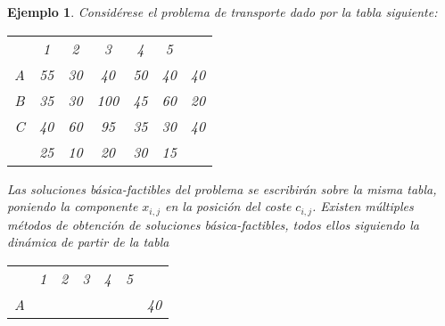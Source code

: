 \documentclass[11pt]{report}
\theoremstyle{mytheorem}
\theoremstyle{mydefinition}
\theoremstyle{myexample}
\newtheorem*{example}{Ejemplo}
\begin{document}
\begin{example}
Considérese el problema de transporte dado por la tabla siguiente:
\begin{center}
\setlength\extrarowheight{2pt}
\begin{tabular}{ccccccc}
    \multicolumn{1}{c}{} & \multicolumn{1}{c}{1} & \multicolumn{1}{c}{2} & \multicolumn{1}{c}{3} & \multicolumn{1}{c}{4} & \multicolumn{1}{c}{5} & \multicolumn{1}{c}{} \\ \cline{2-6}

    \multicolumn{1}{c|}{A} & \multicolumn{1}{c}{55} & \multicolumn{1}{c}{30} & \multicolumn{1}{c}{40} &  \multicolumn{1}{c}{50} & \multicolumn{1}{c|}{40} & \multicolumn{1}{c}{40} \\

    \multicolumn{1}{c|}{B} & \multicolumn{1}{c}{35} & \multicolumn{1}{c}{30} & \multicolumn{1}{c}{100} &  \multicolumn{1}{c}{45} & \multicolumn{1}{c|}{60} & \multicolumn{1}{c}{20} \\
    
    \multicolumn{1}{c|}{C} & \multicolumn{1}{c}{40} & \multicolumn{1}{c}{60} & \multicolumn{1}{c}{95} &  \multicolumn{1}{c}{35} & \multicolumn{1}{c|}{30} & \multicolumn{1}{c}{40} \\[2pt] \cline{2-6}

    \multicolumn{1}{c}{} & \multicolumn{1}{c}{25} & \multicolumn{1}{c}{10} & \multicolumn{1}{c}{20} & \multicolumn{1}{c}{30} & \multicolumn{1}{c}{15} & \multicolumn{1}{c}{} \\
\end{tabular}
\end{center}
Las soluciones básica-factibles del problema se escribirán sobre la misma tabla, poniendo la componente $x_{i,j}$ en la posición del coste $c_{i,j}$. Existen múltiples métodos de obtención de soluciones básica-factibles, todos ellos siguiendo la dinámica de partir de la tabla

\begin{center}
\setlength\extrarowheight{2pt}
\begin{tabular}{ccccccc}
    \multicolumn{1}{c}{} & \multicolumn{1}{c}{1} & \multicolumn{1}{c}{2} & \multicolumn{1}{c}{3} & \multicolumn{1}{c}{4} & \multicolumn{1}{c}{5} & \multicolumn{1}{c}{} \\ \cline{2-6}

    \multicolumn{1}{c|}{A} & \multicolumn{1}{c}{} & \multicolumn{1}{c}{} & \multicolumn{1}{c}{} &  \multicolumn{1}{c}{} & \multicolumn{1}{c|}{} & \multicolumn{1}{c}{40} \\


\end{tabular}
\end{center}
\end{example}
\end{document}
